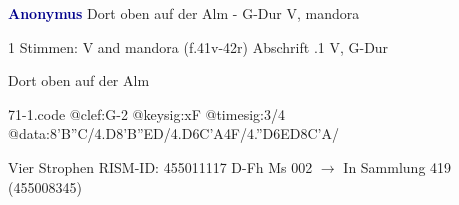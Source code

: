 \documentclass[twocolumn]{book}
\begin{document}
\newline \par \vspace{7pt} \textcolor{darkblue}{\textbf{Anonymus  }}
\newline Dort oben auf der Alm - G-Dur
\newline V, mandora
\newline \begin{itshape}\end{itshape} 
\newline \textcolor{darkblue}{}  1 Stimmen: V and mandora  (f.41v-42r)
\newline Abschrift
.1  V, G-Dur
\newline \begin{footnotesize} Dort oben auf der Alm \end{footnotesize}  
\begin{filecontents*}{71-1.code}
@clef:G-2
@keysig:xF
@timesig:3/4
@data:{8'B''C}/4.D8'B''ED/4.D{6C'A}4F/4.''D{6ED}{8C'A}/
\end{filecontents*}
\newline
%
\newline Vier Strophen
\newline RISM-ID: 455011117
\newline D-Fh  Ms 002
\newline $\rightarrow$ In Sammlung 419 (455008345)
      
\end{document}
